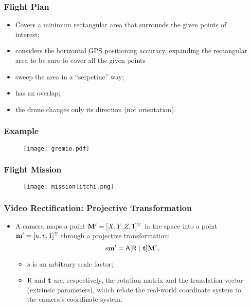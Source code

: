 \documentclass{beamer}
\begin{document}
		\begin{frame}\frametitle{Flight Plan}
			\begin{itemize}
				\item Covers a minimum rectangular area that surrounds the given points of interest;
				\item considers the horizontal GPS positioning accuracy, expanding the rectangular area to be sure to cover all the given points
				\item sweep the area in a ``serpetine'' way;
				\item has an overlap;
				\item the drone changes only its direction (not orientation).
			\end{itemize}
		\end{frame}


		\begin{frame}
			\frametitle{Example}
			\begin{figure}
				\centering
				\texttt{[image: gremio.pdf]}
			\end{figure}
		\end{frame}




		\begin{frame}
			\frametitle{Flight Mission}
			\begin{figure}
				\centering
				\texttt{[image: missionlitchi.png]}
			\end{figure}
		\end{frame}


		\begin{frame}\frametitle{Video Rectification: Projective Transformation}
			\begin{itemize}
			 \item  A camera maps a point $\mathbf{M}' = [X,Y,Z,1]^{\mathrm{T}}$ in the space into a point $\mathbf{m}' = [u,v,1]^{\mathrm{T}}$ through a projective transformation:
			 \begin{equation*}
			\label{eq:projection}
			s\mathbf{m}' = \mathsf{A}[\mathsf{R}~|~\mathbf{t}]\mathbf{M}',
			\end{equation*}
			\begin{itemize}
			 \item $s$ is an arbitrary scale factor;
			 \item $\mathsf{R}$ and $\mathbf{t}$ are, respectively, the rotation matrix and the translation vector (extrinsic parameters), which relate the real-world coordinate system to the camera's coordinate system.
			\end{itemize}
			\end{itemize}
		\end{frame}
\end{document}
